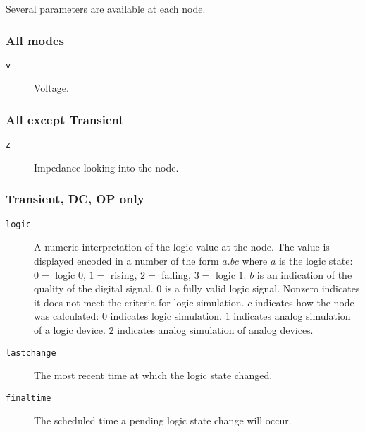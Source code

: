 Several parameters are available at each node.
\subsubsection{All modes}

\begin{description}

\item[{\tt v}] Voltage.

\end{description}
\subsubsection{All except Transient}

\begin{description}

\item[{\tt z}] Impedance looking into the node.

\end{description}
\subsubsection{Transient, DC, OP only}
\begin{description}

\item[{\tt logic}]
A numeric interpretation of the logic value at the node.  The value is
displayed encoded in a number of the form $a.bc$ where $a$ is the
logic state: $0 =$ logic $0$, $1 =$ rising, $2 =$ falling, $3 =$ logic
$1$.  $b$ is an indication of the quality of the digital signal.  $0$
is a fully valid logic signal.  Nonzero indicates it does not meet the
criteria for logic simulation.  $c$ indicates how the node was
calculated: $0$ indicates logic simulation.  $1$ indicates analog
simulation of a logic device.  $2$ indicates analog simulation of
analog devices.

\item[{\tt lastchange}]
The most recent time at which the logic state changed.

\item[{\tt finaltime}]
The scheduled time a pending logic state change will occur.

\end{description}
